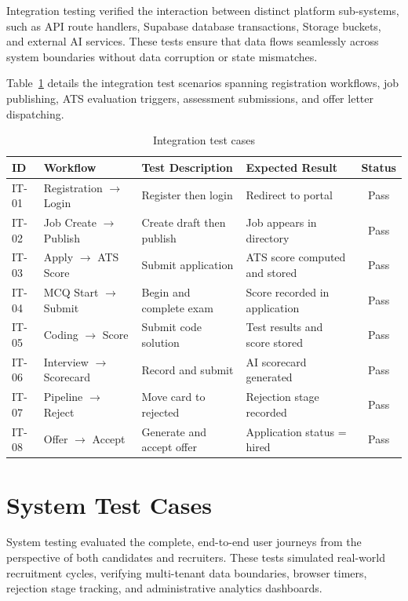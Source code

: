 Integration testing verified the interaction between distinct platform sub-systems, such as API route handlers, Supabase database transactions, Storage buckets, and external AI services. These tests ensure that data flows seamlessly across system boundaries without data corruption or state mismatches.

Table~\ref{tab:integration-tests} details the integration test scenarios spanning registration workflows, job publishing, ATS evaluation triggers, assessment submissions, and offer letter dispatching.

\begin{table}[H]
\centering
\caption{Integration test cases}
\label{tab:integration-tests}
\small
\begin{tabularx}{\textwidth}{l X X X c}
\toprule
\textbf{ID} & \textbf{Workflow} & \textbf{Test Description} & \textbf{Expected Result} & \textbf{Status} \\
\midrule
IT-01 & Registration $\to$ Login & Register then login & Redirect to portal & Pass \\
IT-02 & Job Create $\to$ Publish & Create draft then publish & Job appears in directory & Pass \\
IT-03 & Apply $\to$ ATS Score & Submit application & ATS score computed and stored & Pass \\
IT-04 & MCQ Start $\to$ Submit & Begin and complete exam & Score recorded in application & Pass \\
IT-05 & Coding $\to$ Score & Submit code solution & Test results and score stored & Pass \\
IT-06 & Interview $\to$ Scorecard & Record and submit & AI scorecard generated & Pass \\
IT-07 & Pipeline $\to$ Reject & Move card to rejected & Rejection stage recorded & Pass \\
IT-08 & Offer $\to$ Accept & Generate and accept offer & Application status = hired & Pass \\
\bottomrule
\end{tabularx}
\end{table}

\section{System Test Cases}
\label{sec:system-tests}

System testing evaluated the complete, end-to-end user journeys from the perspective of both candidates and recruiters. These tests simulated real-world recruitment cycles, verifying multi-tenant data boundaries, browser timers, rejection stage tracking, and administrative analytics dashboards.

